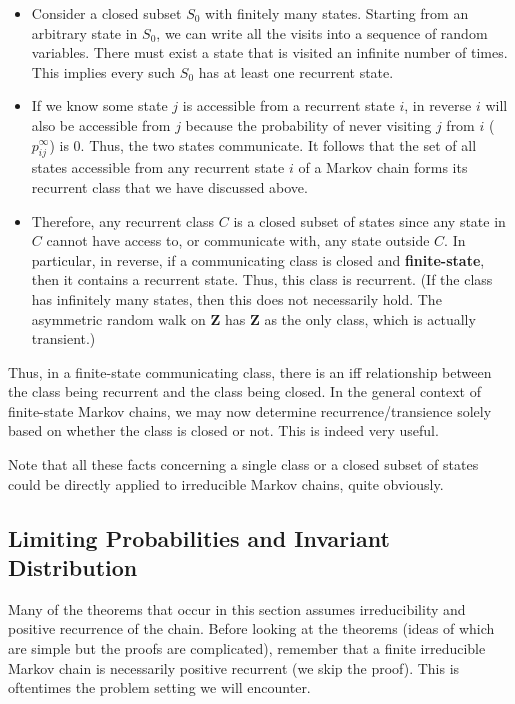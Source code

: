 \documentclass[11pt]{article}
\newcommand{\Z}{\mathbf{Z}}
\begin{document}
\begin{itemize}

\item Consider a closed subset $S_{0}$ with finitely many states. Starting from an arbitrary state in $S_{0}$, we can write all the visits into a sequence of random variables. There must exist a state that is visited an infinite number of times. This implies every such $S_{0}$ has at least one recurrent state.

\item If we know some state $j$ is accessible from a recurrent state $i$, in reverse $i$ will also be accessible from $j$ because the probability of never visiting $j$ from $i$ ($p_{ij}^{\infty }$) is 0. Thus, the two states communicate. It follows that the set of all states accessible from any recurrent state $i$ of a Markov chain forms its recurrent class that we have discussed above.

\item Therefore, any recurrent class $C$ is a closed subset of states since any state in $C$ cannot have access to, or communicate with, any state outside $C$. In particular, in reverse, if a communicating class is closed and \textbf{finite-state}, then it contains a recurrent state. Thus, this class is recurrent. (If the class has infinitely many states, then this does not necessarily hold. The asymmetric random walk on $\Z$ has $\Z$ as the only class, which is actually transient.)

\end{itemize}

Thus, in a finite-state communicating class, there is an iff relationship between the class being recurrent and the class being closed. In the general context of finite-state Markov chains, we may now determine recurrence/transience solely based on whether the class is closed or not. This is indeed very useful.

Note that all these facts concerning a single class or a closed subset of states could be directly applied to irreducible Markov chains, quite obviously.

\subsection{Limiting Probabilities and Invariant Distribution}
Many of the theorems that occur in this section assumes irreducibility and positive recurrence of the chain. Before looking at the theorems (ideas of which are simple but the proofs are complicated), remember that a finite irreducible Markov chain is necessarily positive recurrent (we skip the proof). This is oftentimes the problem setting we will encounter.
\end{document}
